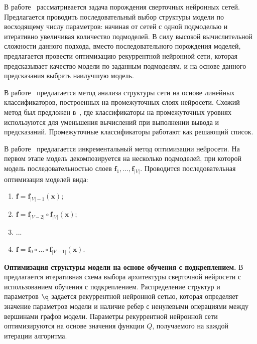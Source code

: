 В работе~\cite{search_smbo} рассматривается задача порождения сверточных нейронных сетей. Предлагается проводить последовательный выбор структуры модели по восходящему числу параметров: начиная от сетей с одной подмоделью  и итеративно увеличивая количество подмоделей. В силу высокой вычислительной сложности данного подхода, вместо последовательного порождения моделей, предлагается провести оптимизацию рекуррентной нейронной сети, которая предсказывает качество модели по заданным подмоделям, и на основе данного предсказания выбрать наилучшую модель.
 
 
 
В работе~\cite{layer_probe} предлагается метод анализа структуры сети на основе линейных классификаторов, построенных на промежуточных слоях нейросети.
Схожий метод был предложен в~\cite{branches}, где классификаторы на промежуточных уровнях используются для уменьшения вычислений при выполнении вывода и предсказаний.
Промежуточные классификаторы работают как решающий список.

В работе~\cite{nn_inc} предлагается инкрементальный метод оптимизации нейросети. На первом этапе модель декомпозируется на несколько подмоделей, при которой модель последовательностью слоев $\mathbf{f}_1,\dots,\mathbf{f}_{|V|}$. Проводится последовательная оптимизация моделей вида:
\begin{enumerate}[1)]
\item $\mathbf{f} = \mathbf{f}_{|V|-1} (\mathbf{x});$
\item $\mathbf{f} = \mathbf{f}_{|V-2|} \circ \mathbf{f}_{|V|} (\mathbf{x});$
\item ...
\item $\mathbf{f} = \mathbf{f}_{0} \circ \dots \circ \mathbf{f}_{|V-1|} (\mathbf{x}).$
\end{enumerate}




\par{\textbf{Оптимизация структуры модели на основе обучения с подкреплением. }}
В~\cite{reinf} предлагается итеративная схема выбора архитектуры сверточной нейросети с использованием обучения с подкреплением. Распределение структур и параметров $\q$ задается рекуррентной нейронной сетью, которая определяет значение параметров модели и наличие ребер с ненулевыми операциями между вершинами графов модели. Параметры рекуррентной нейронной сети оптимизируются на основе значения функции $Q$, получаемого на каждой итерации алгоритма.


